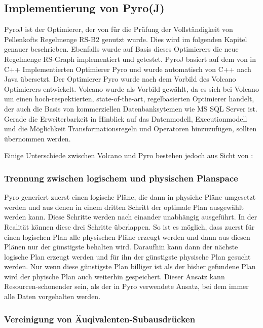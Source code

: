 \subsection{Implementierung von Pyro(J)}
\label{sec:pyroJ}
PyroJ ist der Optimierer, der von \cite{shanbhag2014optimizing} für die Prüfung der Vollständigkeit von Pellenkofts Regelmenge RS-B2 genutzt wurde. Dies wird im folgenden Kapitel genauer beschrieben. Ebenfalls wurde auf Basis dieses Optimierers die neue Regelmenge RS-Graph implementiert und getestet. 
PyroJ basiert auf dem von \cite{roy2001multi} in C++ Implementierten Optimierer Pyro und wurde automatisch von C++ nach Java übersetzt. Der Optimierer Pyro wurde nach dem Vorbild des Volcano Optimierers entwickelt. Volcano wurde als Vorbild gewählt, da es sich bei Volcano um einen hoch-respektierten, state-of-the-art, regelbasierten Optimierer handelt, der auch die Basis von kommerziellen Datenbanksytemen wie MS SQL Server ist. Gerade die Erweiterbarkeit in Hinblick auf das Datenmodell, Executionmodell und die Möglichkeit Transformationsregeln und Operatoren hinzuzufügen, sollten übernommen werden.


Einige Unterschiede zwischen Volcano und Pyro bestehen jedoch aus Sicht von \cite{roy2001multi}:

\subsubsection{Trennung zwischen logischem und physischen Planspace}

Pyro generiert zuerst einen logische Pläne, die dann in physiche Pläne umgesetzt werden und aus denen in einem dritten Schritt der optimale Plan ausgewählt werden kann. Diese Schritte werden nach einander unabhängig ausgeführt. In der Realität können diese drei Schritte überlappen. So ist es möglich, dass zuerst für einen logischen Plan alle physischen Pläne erzeugt werden und dann aus diesen Plänen nur der günstigste behalten wird. Daraufhin kann dann der nächste logische Plan erzeugt werden und für ihn der günstigste physische Plan gesucht werden. Nur wenn diese günstigste Plan billiger ist als der bisher gefundene Plan wird der phyische Plan auch weiterhin gespeichert. Dieser Ansatz kann Resourcen-schonender sein, als der in Pyro verwendete Ansatz, bei dem immer alle Daten vorgehalten werden. 

\subsubsection{Vereinigung von Äuqivalenten-Subausdrücken}

